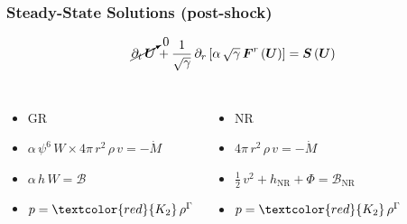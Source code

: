\documentclass{beamer}
\newcommand{\red}{\textcolor{red}}
\newcommand{\p}{\partial}
\newcommand{\bs}{\boldsymbol}
\newcommand{\nr}{\mathrm{NR}}
\newcommand{\mdot}{\dot{M}}
\begin{document}
\begin{frame}
\frametitle{Steady-State Solutions (post-shock)}

  \begin{equation*}
    \cancelto{0}{\p_{t}\,\bs{U}}
    +\frac{1}{\sqrt{\gamma}}\,
    \p_{r}\left[\alpha\,\sqrt{\gamma}\,\bs{F}^{r}\left(\bs{U}\right)\right]
    =\bs{S}\left(\bs{U}\right)
  \end{equation*}

  \begin{columns}[c]


      \begin{itemize}
        \item[]
          GR
        \item[]
          $\alpha\,\psi^{6}\,W\times4\pi\,r^{2}\,\rho\,v=-\mdot$
        \item[]
          $\alpha\,h\,W=\mathcal{B}$
        \item[]
          $p=\red{K_{2}}\,\rho^{\Gamma}$
      \end{itemize}


      \begin{itemize}
        \item[]
          NR
        \item[]
          $4\pi\,r^{2}\,\rho\,v=-\mdot$
        \item[]
          $\frac{1}{2}\,v^{2}+h_{\nr}+\Phi=\mathcal{B}_{\nr}$
        \item[]
          $p=\red{K_{2}}\,\rho^{\Gamma}$
      \end{itemize}

  \end{columns}

\end{frame}
\end{document}
